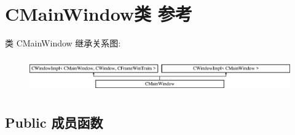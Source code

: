 \hypertarget{class_c_main_window}{}\section{C\+Main\+Window类 参考}
\label{class_c_main_window}
类 C\+Main\+Window 继承关系图\+:\begin{figure}[H]
\begin{center}
\leavevmode
\includegraphics[height=1.521739cm]{class_c_main_window}
\end{center}
\end{figure}
\subsection*{Public 成员函数}
